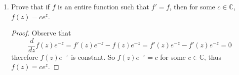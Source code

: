 \documentclass[10pt]{article}
\newcommand{\C}{\mathbb{C}}
\begin{document}
\begin{enumerate}
\item Prove that if $f$ is an entire function such that $f' = f$, then for some $c \in \C$, $f(z) = c e^z$.
\begin{proof}
Observe that
$$
\frac{d}{dz}f(z)e^{-z} = f'(z)e^{-z} - f(z)e^{-z} = f'(z)e^{-z} - f'(z)e^{-z} = 0
$$
therefore $f(z)e^{-z}$ is constant.  So $f(z)e^{-z} = c$ for some $c \in \C$, thus $f(z)=ce^{z}$.
\end{proof}
\end{enumerate}
\end{document}
